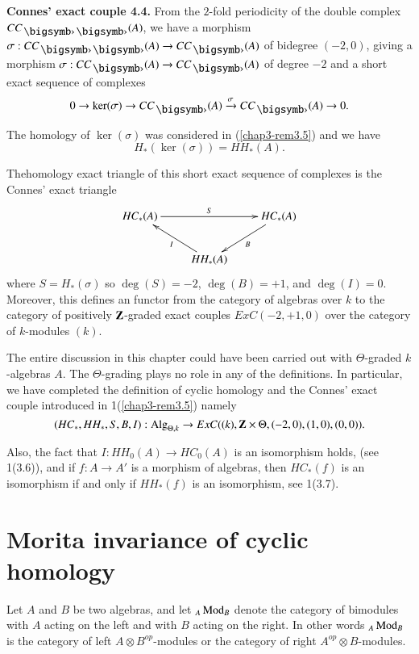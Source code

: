 \noindent
{\bf Connes' exact couple 4.4.} From the $2$-fold periodicity of the
double complex $CC_{\bigdot\bigdot}(A)$, we have a morphism
$\sigma:CC_{\bigdot\bigdot}(A)\to CC_{\bigdot}(A)$ of bidegree
$(-2,0)$, giving a morphism $\sigma:CC_{\bigdot}(A)\to
CC_{\bigdot}(A)$ of degree $-2$ and a short exact sequence of
complexes
$$
0\to \ker(\sigma)\to
  CC_{\bigdot}(A)\xrightarrow{\sigma}CC_{\bigdot}(A)\to 0.
$$

The homology of $\ker(\sigma)$ was considered in (\ref{chap3-rem3.5})
and we have
$$
H_{\ast}(\ker(\sigma))=HH_{\ast}(A).
$$

The\pageoriginale homology exact triangle of this short exact sequence
of complexes is the Connes' exact triangle
\[
\xymatrix{
HC_{\ast}(A)\ar[rr]^{S} & & HC_{\ast}(A)\ar[dl]^{B}\\
 & HH_{\ast}(A)\ar[ul]^{I} & 
}
\]
where $S=H_{\ast}(\sigma)$ so $\deg(S)=-2$, $\deg(B)=+1$, and
$\deg(I)=0$. Moreover, this defines an functor from the category of
algebras over $k$ to the category of positively $\mathbf{Z}$-graded exact
couples $ExC(-2,+1,0)$ over the category of $k$-modules $(k)$.

\begin{remark}\label{chap3-rem4.5}
The entire discussion in this chapter could have been carried out with
$\Theta$-graded $k$-algebras $A$. The $\Theta$-grading plays no role
in any of the definitions. In particular, we have completed the
definition of cyclic homology and the Connes' exact couple introduced
in 1(\ref{chap3-rem3.5}) namely
$$
(HC_{\ast},HH_{\ast},S,B,I):\operatorname{Alg}_{\Theta,k}\to
ExC((k),\mathbf{Z}\times\Theta,(-2,0),(1,0),(0,0)). 
$$

Also, the fact that $I:HH_{0}(A)\to HC_{0}(A)$ is an isomorphism
holds, (see 1(3.6)), and if $f:A\to A'$ is a morphism of algebras,
then $HC_{\ast}(f)$ is an isomorphism if and only if $HH_{\ast}(f)$ is
an isomorphism, see 1(3.7).
\end{remark}

\section{Morita invariance of cyclic
  homology}\label{chap3-sec5}

Let $A$ and $B$ be two algebras, and let ${}_{A}\operatorname{Mod}_{B}$ denote the
category of bimodules with $A$ acting on the left and with $B$ acting
on the right. In other words ${}_{A}\operatorname{Mod}_{B}$ is the category of left
$A\otimes B^{op}$-modules or the category of right $A^{op}\otimes
B$-modules. 

